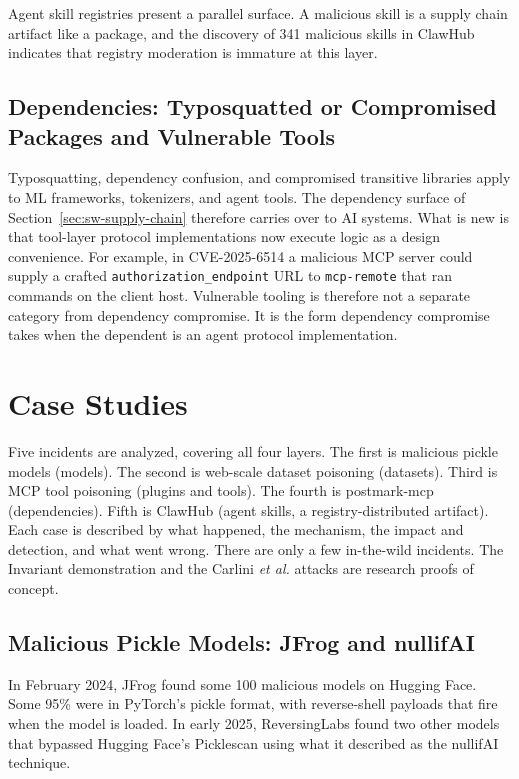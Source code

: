 \documentclass[conference]{IEEEtran}
\begin{document}
Agent skill registries present a parallel surface. A malicious skill is a supply chain artifact like a package, and the discovery of 341 malicious skills in ClawHub indicates that registry moderation is immature at this layer.

\subsection{Dependencies: Typosquatted or Compromised Packages and Vulnerable Tools}
\label{sec:tax-dependencies}

Typosquatting, dependency confusion, and compromised transitive libraries apply to ML frameworks, tokenizers, and agent tools. The dependency surface of Section~\ref{sec:sw-supply-chain} therefore carries over to AI systems. What is new is that tool-layer protocol implementations now execute logic as a design convenience. For example, in CVE-2025-6514 a malicious MCP server could supply a crafted \texttt{authorization\_endpoint} URL to \texttt{mcp-remote} that ran commands on the client host. Vulnerable tooling is therefore not a separate category from dependency compromise. It is the form dependency compromise takes when the dependent is an agent protocol implementation.

\section{Case Studies}
\label{sec:cases}

Five incidents are analyzed, covering all four layers. The first is malicious pickle models (models). The second is web-scale dataset poisoning (datasets). Third is MCP tool poisoning (plugins and tools). The fourth is postmark-mcp (dependencies). Fifth is ClawHub (agent skills, a registry-distributed artifact). Each case is described by what happened, the mechanism, the impact and detection, and what went wrong. There are only a few in-the-wild incidents. The Invariant demonstration and the Carlini \textit{et al.} attacks are research proofs of concept.

\subsection{Malicious Pickle Models: JFrog and nullifAI}
\label{sec:casemodels}

In February 2024, JFrog found some 100 malicious models on Hugging Face. Some 95\% were in PyTorch's pickle format, with reverse-shell payloads that fire when the model is loaded. In early 2025, ReversingLabs found two other models that bypassed Hugging Face's Picklescan using what it described as the nullifAI technique.
\end{document}
